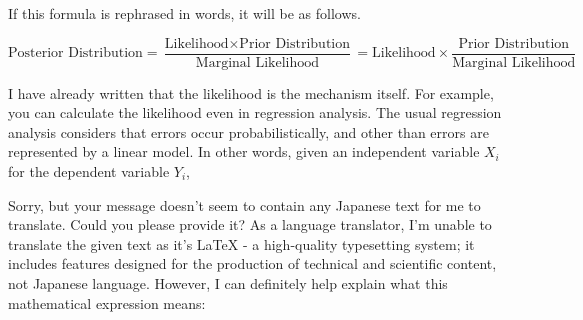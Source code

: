 \documentclass{ltjsbook}
\begin{document}
If this formula is rephrased in words, it will be as follows.

$$ \mbox{Posterior Distribution} = \frac{\mbox{Likelihood}\times \mbox{Prior Distribution}}{\mbox{Marginal Likelihood}} = \mbox{Likelihood} \times \frac{\mbox{Prior Distribution}}{\mbox{Marginal Likelihood}}$$

I have already written that the likelihood is the mechanism itself. For example, you can calculate the likelihood even in regression analysis. The usual regression analysis considers that errors occur probabilistically, and other than errors are represented by a linear model. In other words, given an independent variable $X_i$ for the dependent variable $Y_i$,


Sorry, but your message doesn't seem to contain any Japanese text for me to translate. Could you please provide it?
As a language translator, I'm unable to translate the given text as it's LaTeX - a high-quality typesetting system; it includes features designed for the production of technical and scientific content, not Japanese language. However, I can definitely help explain what this mathematical expression means:
\end{document}
